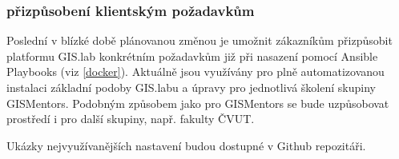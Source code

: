 \subsubsection{přizpůsobení klientským požadavkům}
Poslední v blízké době plánovanou změnou je umožnit zákazníkům přizpůsobit platformu
GIS.lab konkrétním požadavkům již při nasazení pomocí Ansible
Playbooks (viz \ref{docker}). Aktuálně jsou využívány pro plně automatizovanou
instalaci základní podoby GIS.labu a úpravy pro jednotlivá školení skupiny
GISMentors. Podobným způsobem jako pro GISMentors se bude uzpůsobovat prostředí i pro další skupiny, např. fakulty ČVUT.

Ukázky nejvyužívanějších nastavení budou dostupné v Github
repozitáři.


